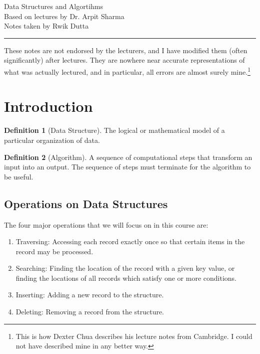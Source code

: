 \documentclass[10pt, a4paper]{extarticle}
\theoremstyle{definition}
\newtheorem{defn}{Definition}
\begin{document}
\begin{center}
	\fontsize{25}{60}\selectfont Data Structures and Algortihms \\
	\large Based on lectures by Dr. Arpit Sharma\\
	Notes taken by Rwik Dutta
\end{center}
\hrule
\begin{center}
	These notes are not endorsed by the lecturers, and I have modified them (often
	significantly) after lectures. They are nowhere near accurate representations of what
	was actually lectured, and in particular, all errors are almost surely mine.\footnote[1]{This is how Dexter Chua describes his lecture notes from Cambridge. I could not have described mine in any better way.}
\end{center}
\tableofcontents

\newpage
\section{Introduction}
\begin{defn}[Data Structure]
	The logical or mathematical model of a particular organization of data.
\end{defn}
\begin{defn}[Algorithm]
	A sequence of computational steps that transform an input into an output. The sequence of steps must terminate for the algorithm to be useful.
\end{defn}
\subsection{Operations on Data Structures}
The four major operations that we will focus on in this course are:
\begin{enumerate}
	\item Traversing: Accessing each record exactly once so that certain items in the record may be processed.
	\item Searching: Finding the location of the record with a given key value, or finding the locations of all records which satisfy one or more conditions.
	\item Inserting: Adding a new record to the structure.
	\item Deleting: Removing a record from the structure.
\end{enumerate}
\end{document}
